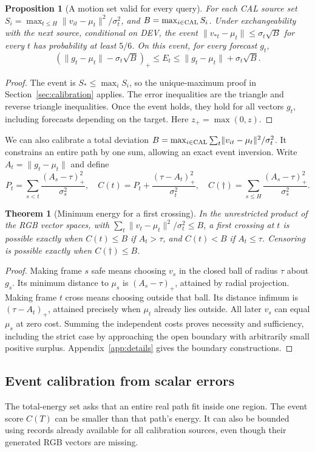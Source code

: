 \documentclass[11pt]{article}
\theoremstyle{noteplain}
\newtheorem{theorem}{Theorem}
\newtheorem{proposition}{Proposition}
\newcommand{\norm}[1]{\lVert #1\rVert}
\newcommand{\dd}{\dagger}
\begin{document}
\begin{proposition}[A motion set valid for every query]\label{prop:tube}
For each CAL source set $S_i=\max_{t\le H}\norm{v_{it}-\mu_t}^2/\sigma_t^2$, and $B=\max_{i\in{\rm CAL}}S_i$. Under exchangeability with the next source, conditional on DEV, the event
$\norm{v_{*t}-\mu_t}\le\sigma_t\sqrt B$ for every $t$ has probability at least $5/6$. On this event, for \emph{every} forecast $g_t$,
\[
 (\norm{g_t-\mu_t}-\sigma_t\sqrt B)_+
 \le E_t\le \norm{g_t-\mu_t}+\sigma_t\sqrt B .
\]
\end{proposition}
\begin{proof}
The event is $S_*\le\max_i S_i$, so the unique-maximum proof in Section~\ref{sec:calibration} applies. The error inequalities are the triangle and reverse triangle inequalities. Once the event holds, they hold for all vectors $g_t$, including forecasts depending on the target. Here $z_+=\max(0,z)$.
\end{proof}

We can also calibrate a total deviation $B=\max_{i\in{\rm CAL}}\sum_t\norm{v_{it}-\mu_t}^2/\sigma_t^2$. It constrains an entire path by one sum, allowing an exact event inversion. Write $A_t=\norm{g_t-\mu_t}$ and define
\[
 P_t=\sum_{s<t}\frac{(A_s-\tau)_+^2}{\sigma_s^2},\quad
 C(t)=P_t+\frac{(\tau-A_t)_+^2}{\sigma_t^2},\quad
 C(\dd)=\sum_{s\le H}\frac{(A_s-\tau)_+^2}{\sigma_s^2}.
\]
\begin{theorem}[Minimum energy for a first crossing]\label{thm:energy}
In the unrestricted product of the RGB vector spaces, with
$\sum_t\norm{v_t-\mu_t}^2/\sigma_t^2\le B$, a first crossing at $t$ is possible exactly when $C(t)\le B$ if $A_t>\tau$, and $C(t)<B$ if $A_t\le\tau$. Censoring is possible exactly when $C(\dd)\le B$.
\end{theorem}
\begin{proof}
Making frame $s$ safe means choosing $v_s$ in the closed ball of radius $\tau$ about $g_s$. Its minimum distance to $\mu_s$ is $(A_s-\tau)_+$, attained by radial projection. Making frame $t$ cross means choosing outside that ball. Its distance infimum is $(\tau-A_t)_+$, attained precisely when $\mu_t$ already lies outside. All later $v_s$ can equal $\mu_s$ at zero cost. Summing the independent costs proves necessity and sufficiency, including the strict case by approaching the open boundary with arbitrarily small positive surplus. Appendix~\ref{app:details} gives the boundary constructions.
\end{proof}

\subsection{Event calibration from scalar errors}\label{sec:event}
The total-energy set asks that an entire real path fit inside one region. The event score $C(T)$ can be smaller than that path's energy. It can also be bounded using records already available for all calibration sources, even though their generated RGB vectors are missing.
\end{document}
